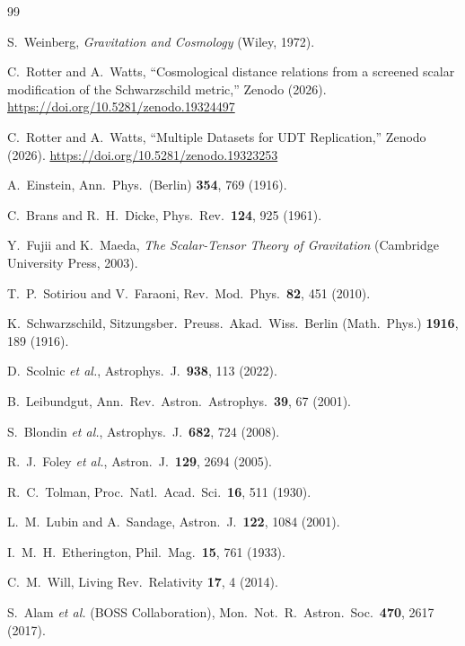 \documentclass[aps,prd,twocolumn,superscriptaddress,nofootinbib,longbibliography]{revtex4-2}
\begin{document}
\begin{thebibliography}{99}

S.~Weinberg,
\textit{Gravitation and Cosmology}
(Wiley, 1972).

C.~Rotter and A.~Watts,
``Cosmological distance relations from a screened scalar
modification of the Schwarzschild metric,''
Zenodo (2026).
\url{https://doi.org/10.5281/zenodo.19324497}

C.~Rotter and A.~Watts,
``Multiple Datasets for UDT Replication,''
Zenodo (2026).
\url{https://doi.org/10.5281/zenodo.19323253}

A.~Einstein,
Ann.\ Phys.\ (Berlin) \textbf{354}, 769 (1916).

C.~Brans and R.~H.~Dicke,
Phys.\ Rev.\ \textbf{124}, 925 (1961).

Y.~Fujii and K.~Maeda,
\textit{The Scalar-Tensor Theory of Gravitation}
(Cambridge University Press, 2003).

T.~P.~Sotiriou and V.~Faraoni,
Rev.\ Mod.\ Phys.\ \textbf{82}, 451 (2010).


K.~Schwarzschild,
Sitzungsber.\ Preuss.\ Akad.\ Wiss.\ Berlin (Math.\ Phys.)
\textbf{1916}, 189 (1916).

D.~Scolnic \textit{et al.},
Astrophys.\ J.\ \textbf{938}, 113 (2022).

B.~Leibundgut,
Ann.\ Rev.\ Astron.\ Astrophys.\ \textbf{39}, 67 (2001).

S.~Blondin \textit{et al.},
Astrophys.\ J.\ \textbf{682}, 724 (2008).

R.~J.~Foley \textit{et al.},
Astron.\ J.\ \textbf{129}, 2694 (2005).

R.~C.~Tolman,
Proc.\ Natl.\ Acad.\ Sci.\ \textbf{16}, 511 (1930).

L.~M.~Lubin and A.~Sandage,
Astron.\ J.\ \textbf{122}, 1084 (2001).

I.~M.~H.~Etherington,
Phil.\ Mag.\ \textbf{15}, 761 (1933).

C.~M.~Will,
Living Rev.\ Relativity \textbf{17}, 4 (2014).

S.~Alam \textit{et al.} (BOSS Collaboration),
Mon.\ Not.\ R.\ Astron.\ Soc.\ \textbf{470}, 2617 (2017).


\end{thebibliography}
\end{document}
